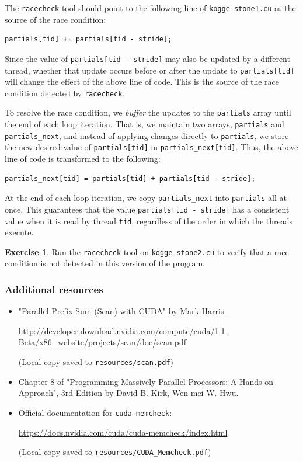 \documentclass{article}
\newcommand{\resource}[1]{(Local copy saved to \texttt{#1})}
\theoremstyle{definition}
\newtheorem{exercise}{Exercise}
\begin{document}
The \texttt{racecheck} tool should point to the following line of \texttt{kogge-stone1.cu} as the source of the race condition:

\begin{verbatim}
partials[tid] += partials[tid - stride];
\end{verbatim}

Since the value of \texttt{partials[tid - stride]} may also be updated by a different thread, whether that update occurs before or after the update to \texttt{partials[tid]} will change the effect of the above line of code. This is the source of the race condition detected by \texttt{racecheck}.

To resolve the race condition, we \emph{buffer} the updates to the \texttt{partials} array until the end of each loop iteration. That is, we maintain two arrays, \texttt{partials} and \texttt{partials\_next}, and instead of applying changes directly to \texttt{partials}, we store the new desired value of \texttt{partials[tid]} in \texttt{partials\_next[tid]}. Thus, the above line of code is transformed to the following:

\begin{verbatim}
partials_next[tid] = partials[tid] + partials[tid - stride];
\end{verbatim}

At the end of each loop iteration, we copy \texttt{partials\_next} into \texttt{partials} all at once. This guarantees that the value \texttt{partials[tid - stride]} has a consistent value when it is read by thread \texttt{tid}, regardless of the order in which the threads execute.

\begin{exercise}
Run the \texttt{racecheck} tool on \texttt{kogge-stone2.cu} to verify that a race condition is not detected in this version of the program.
\end{exercise}

\subsubsection*{Additional resources}
\begin{itemize}
    \item "Parallel Prefix Sum (Scan) with CUDA" by Mark Harris.
    
    \url{http://developer.download.nvidia.com/compute/cuda/1.1-Beta/x86_website/projects/scan/doc/scan.pdf}
    
    \resource{resources/scan.pdf}
    
    \item Chapter 8 of "Programming Massively Parallel Processors: A Hands-on Approach", 3rd Edition by David B. Kirk, Wen-mei W. Hwu.
    
    \item Official documentation for \texttt{cuda-memcheck}:
    
    \url{https://docs.nvidia.com/cuda/cuda-memcheck/index.html}
    
    \resource{resources/CUDA\_Memcheck.pdf}
\end{itemize}
\end{document}
